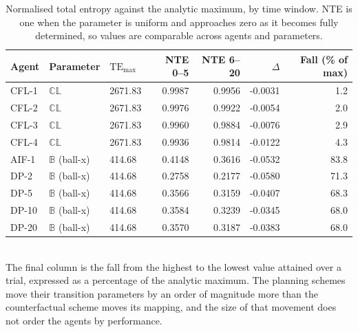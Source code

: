 \begin{table}[ht]
\centering
\small
\caption{Normalised total entropy against the analytic maximum, by time window. NTE is one when the parameter is uniform and approaches zero as it becomes fully determined, so values are comparable across agents and parameters.}
\label{tab:nte}
\begin{tabular}{lllrrrr}
\toprule
Agent & Parameter & $\mathrm{TE}_{\max}$ & NTE 0--5 & NTE 6--20 & $\Delta$ & Fall (\% of max) \\
\midrule
CFL-1 & $\mathbb{CL}$ & 2671.83 & 0.9987 & 0.9956 & -0.0031 & 1.2 \\
CFL-2 & $\mathbb{CL}$ & 2671.83 & 0.9976 & 0.9922 & -0.0054 & 2.0 \\
CFL-3 & $\mathbb{CL}$ & 2671.83 & 0.9960 & 0.9884 & -0.0076 & 2.9 \\
CFL-4 & $\mathbb{CL}$ & 2671.83 & 0.9936 & 0.9814 & -0.0122 & 4.3 \\
AIF-1 & $\mathbb{B}$ (ball-x) & 414.68 & 0.4148 & 0.3616 & -0.0532 & 83.8 \\
DP-2 & $\mathbb{B}$ (ball-x) & 414.68 & 0.2758 & 0.2177 & -0.0580 & 71.3 \\
DP-5 & $\mathbb{B}$ (ball-x) & 414.68 & 0.3566 & 0.3159 & -0.0407 & 68.3 \\
DP-10 & $\mathbb{B}$ (ball-x) & 414.68 & 0.3584 & 0.3239 & -0.0345 & 68.0 \\
DP-20 & $\mathbb{B}$ (ball-x) & 414.68 & 0.3570 & 0.3187 & -0.0383 & 68.0 \\
\bottomrule
\end{tabular}
\\[4pt]\footnotesize{The final column is the fall from the highest to the lowest value attained over a trial, expressed as a percentage of the analytic maximum. The planning schemes move their transition parameters by an order of magnitude more than the counterfactual scheme moves its mapping, and the size of that movement does not order the agents by performance.}
\end{table}
